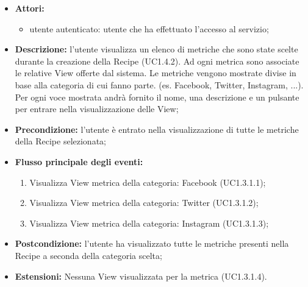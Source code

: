 \begin{itemize}
	\item \textbf{Attori:}
	\begin{itemize}
		\item utente autenticato: utente che ha effettuato l'accesso al servizio;
	\end{itemize}
	\item \textbf{Descrizione:} l'utente visualizza un elenco di metriche che sono state scelte durante la creazione della Recipe (UC1.4.2). Ad ogni metrica sono associate le relative View offerte dal sistema. Le metriche vengono mostrate divise in base alla categoria di cui fanno parte. (es. Facebook, Twitter, Instagram, ...). Per ogni voce mostrata andrà fornito il nome, una descrizione e un pulsante per entrare nella visualizzazione delle View;
	\item \textbf{Precondizione:} l'utente è entrato nella visualizzazione di tutte le metriche della Recipe selezionata;
	\item \textbf{Flusso principale degli eventi:}
	\begin{enumerate}
		\item Visualizza View metrica della categoria: Facebook (UC1.3.1.1);
		\item Visualizza View metrica della categoria: Twitter (UC1.3.1.2);
		\item Visualizza View metrica della categoria: Instagram (UC1.3.1.3);
	\end{enumerate}
	\item \textbf{Postcondizione:} l'utente ha visualizzato tutte le metriche presenti nella Recipe a seconda della categoria scelta;
	\item \textbf{Estensioni:} Nessuna View visualizzata per la metrica (UC1.3.1.4).
\end{itemize}

